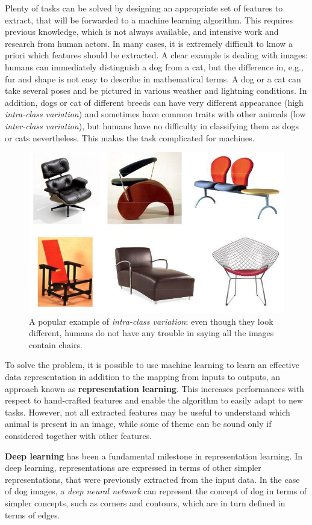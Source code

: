 \documentclass[%
    corpo=12pt,
    twoside,
    stile=classica,   
    tipotesi=magistrale,
    evenboxes,
    english,
	numerazioneromana,
]{toptesi}
\begin{document}
Plenty of tasks can be solved by designing an appropriate set of features to extract, that will be forwarded to a machine learning algorithm. This requires previous knowledge, which is not always available, and intensive work and research from human actors. In many cases, it is extremely difficult to know a priori which features should be extracted. A clear example is dealing with images: humans can immediately distinguish a dog from a cat, but the difference in, e.g., fur and shape is not easy to describe in mathematical terms. A dog or a cat can take several poses and be pictured in various weather and lightning conditions. In addition, dogs or cat of different breeds can have very different appearance (high \textit{intra-class variation}) and sometimes have common traits with other animals (low \textit{inter-class variation}), but humans have no difficulty in classifying them as dogs or cats nevertheless. This makes the task complicated for machines.

\begin{figure}[ht]
	\centering
	\includegraphics[width=.7\linewidth]{imgs/chairs.png}
	\caption{A popular example of \textit{intra-class variation}: even though they look different, humans do not have any trouble in saying all the images contain chairs.}
	\label{fig:intraclass}
\end{figure}

To solve the problem, it is possible to use machine learning to learn an effective data representation in addition to the mapping from inputs to outputs, an approach known as \textbf{representation learning}. This increases performances with respect to hand-crafted features and enable the algorithm to easily adapt to new tasks. However, not all extracted features may be useful to understand which animal is present in an image, while some of theme can be sound only if considered together with other features.

\bigskip
\textbf{Deep learning} has been a fundamental milestone in representation learning. In deep learning, representations are expressed in terms of other simpler representations, that were previously extracted from the input data. In the case of dog images, a \textit{deep neural network} can represent the concept of dog in terms of simpler concepts, such as corners and contours, which are in turn defined in terms of edges\cite{goodfellow2016deep}.
\end{document}

